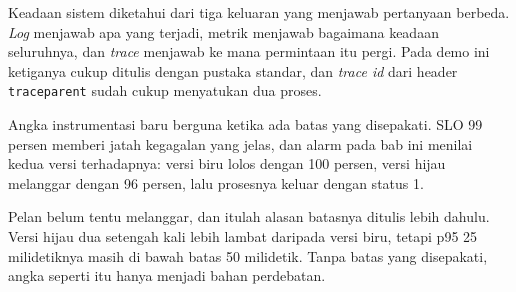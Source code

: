 Keadaan sistem diketahui dari tiga keluaran yang menjawab pertanyaan berbeda.
\textit{Log} menjawab apa yang terjadi, metrik menjawab bagaimana keadaan
seluruhnya, dan \textit{trace} menjawab ke mana permintaan itu pergi. Pada
demo ini ketiganya cukup ditulis dengan pustaka standar, dan \textit{trace
id} dari header \texttt{traceparent} sudah cukup menyatukan dua proses.

Angka instrumentasi baru berguna ketika ada batas yang disepakati. SLO 99
persen memberi jatah kegagalan yang jelas, dan alarm pada bab ini menilai
kedua versi terhadapnya: versi biru lolos dengan 100 persen, versi hijau
melanggar dengan 96 persen, lalu prosesnya keluar dengan status 1.

Pelan belum tentu melanggar, dan itulah alasan batasnya ditulis lebih dahulu.
Versi hijau dua setengah kali lebih lambat daripada versi biru, tetapi p95
25 milidetiknya masih di bawah batas 50 milidetik. Tanpa batas yang
disepakati, angka seperti itu hanya menjadi bahan perdebatan.
